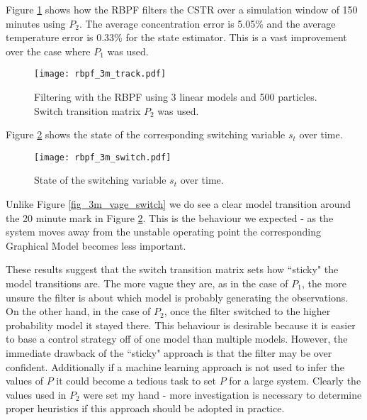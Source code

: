 Figure \ref{fig_3m_track} shows how the RBPF filters the CSTR over a simulation window of 150 minutes using $P_2$. The average concentration error is 5.05\% and the average temperature error is 0.33\% for the state estimator. This is a vast improvement over the case where $P_1$ was used.
\begin{figure}[H] 
\centering
\texttt{[image: rbpf\_3m\_track.pdf]}
\caption{Filtering with the RBPF using 3 linear models and 500 particles. Switch transition matrix $P_2$ was used.}
\label{fig_3m_track}
\end{figure}
Figure \ref{fig_3m_switch} shows the state of the corresponding switching variable $s_t$ over time.
\begin{figure}[H] 
\centering
\texttt{[image: rbpf\_3m\_switch.pdf]}
\caption{State of the switching variable $s_t$ over time.}
\label{fig_3m_switch}
\end{figure}
Unlike Figure \ref{fig_3m_vage_switch} we do see a clear model transition around the 20 minute mark in Figure \ref{fig_3m_switch}. This is the behaviour we expected - as the system moves away from the unstable operating point the corresponding Graphical Model becomes less important.

These results suggest that the switch transition matrix sets how ``sticky" the model transitions are. The more vague they are, as in the case of $P_1$, the more unsure the filter is about which model is probably generating the observations. On the other hand, in the case of $P_2$, once the filter switched to the higher probability model it stayed there. This behaviour is desirable because it is easier to base a control strategy off of one model than multiple models. However, the immediate drawback of the ``sticky" approach is that the filter may be over confident. Additionally if a machine learning approach is not used to infer the values of $P$ it could become a tedious task to set $P$ for a large system. Clearly the values used in $P_2$ were set my hand - more investigation is necessary to determine proper heuristics if this approach should be adopted in practice.

